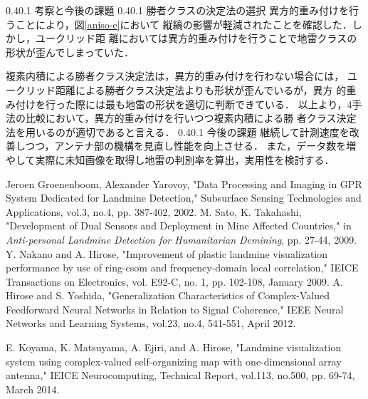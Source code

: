 ﻿\documentclass[a4j, 10pt]{jarticle}
\makeatletter
\renewcommand{\refname}{参考文献}
\renewcommand{\section}{%
\@startsection{section}{1}{\z@}%
{0.4\Cvs}{0.1\Cvs}%
{\bf\large}}
\renewcommand{\subsection}{%
\@startsection{subsection}{1}{\z@}%
{0.4\Cvs}{0.1\Cvs}%
{\bf\large}}
\makeatother
\begin{document}
\section{考察と今後の課題}
\subsection{勝者クラスの決定法の選択}
異方的重み付けを行うことにより，図\ref{aniso-e}において
縦縞の影響が軽減されたことを確認した．しかし，ユークリッド距
離においては異方的重み付けを行うことで地雷クラスの形状が歪んでしまっていた．

複素内積による勝者クラス決定法は，異方的重み付けを行わない場合には，
ユークリッド距離による勝者クラス決定法よりも形状が歪んでいるが，異方
的重み付けを行った際には最も地雷の形状を適切に判断できている．
以上より，4手法の比較において，異方的重み付けを行いつつ複素内積による勝
者クラス決定法を用いるのが適切であると言える．
\subsection{今後の課題}
継続して計測速度を改善しつつ，アンテナ部の機構を見直し性能を向上させる．
また，データ数を増やして実際に未知画像を取得し地雷の判別率を算出，実用性を検討する．
%
{\tiny
\begin{thebibliography}{99}%
 Jeroen Groenenboom, Alexander Yarovoy,
"Data Processing and Imaging in GPR System Dedicated for Landmine
Detection," Subsurface Sensing Technologies and Applications, vol.3,
        no.4, pp. 387-402, 2002.
  M. Sato, K. Takahashi, "Development of
        Dual Sensors and Deployment in Mine Affected
        Countries," in {\it Anti-personal Landmine Detection for
        Humanitarian Demining}, pp. 27-44, 2009.
 Y. Nakano and A. Hirose, "Improvement of plastic
        landmine visualization performance by use of ring-csom and
        frequency-domain local correlation," IEICE Transactions on
        Electronics, vol. E92-C, no. 1, pp. 102-108, January 2009.
 A. Hirose and S. Yoshida, "Generalization
        Characteristics of Complex-Valued Feedforward Neural Networks in
        Relation to Signal Coherence," IEEE Neural Networks and Learning
        Systems, vol.23, no.4, 541-551, April 2012.
\end{thebibliography}
\renewcommand{\refname}{発表文献}
\begin{thebibliography}{9}
 E. Koyama, K. Matsuyama, A. Ejiri, and
        A. Hirose, "Landmine visualization system using complex-valued
        self-organizing map with one-dimensional array antenna," IEICE
        Neurocomputing, Technical Report, vol.113, no.500, 
        pp. 69-74, March 2014.
\end{thebibliography}
}
\end{document}
